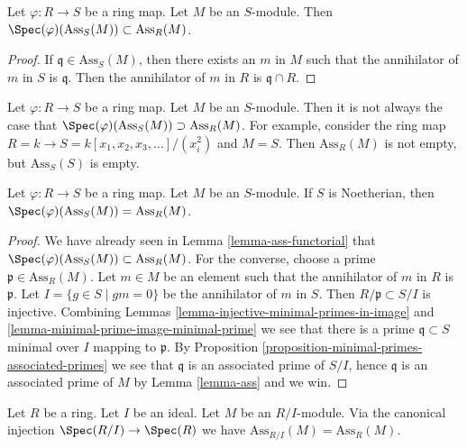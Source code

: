 \begin{lemma}
\label{lemma-ass-functorial}
Let $\varphi : R \to S$ be a ring map.
Let $M$ be an $S$-module.
Then $\Spec(\varphi)(\text{Ass}_S(M)) \subset \text{Ass}_R(M)$.
\end{lemma}

\begin{proof}
If $\mathfrak q \in \text{Ass}_S(M)$, then there exists an $m$ in $M$
such that the annihilator of $m$ in $S$ is $\mathfrak q$. Then the annihilator
of $m$ in $R$ is $\mathfrak q \cap R$.
\end{proof}

\begin{remark}
\label{remark-ass-reverse-functorial}
Let $\varphi : R \to S$ be a ring map.
Let $M$ be an $S$-module.
Then it is not always the case that
$\Spec(\varphi)(\text{Ass}_S(M)) \supset \text{Ass}_R(M)$.
For example, consider the ring map
$R = k \to S = k[x_1, x_2, x_3, \ldots]/(x_i^2)$ and $M = S$.
Then $\text{Ass}_R(M)$ is not empty, but $\text{Ass}_S(S)$ is empty.
\end{remark}

\begin{lemma}
\label{lemma-ass-functorial-Noetherian}
Let $\varphi : R \to S$ be a ring map.
Let $M$ be an $S$-module. If $S$ is Noetherian, then
$\Spec(\varphi)(\text{Ass}_S(M)) = \text{Ass}_R(M)$.
\end{lemma}

\begin{proof}
We have already seen in
Lemma \ref{lemma-ass-functorial}
that
$\Spec(\varphi)(\text{Ass}_S(M)) \subset \text{Ass}_R(M)$.
For the converse, choose a prime $\mathfrak p \in \text{Ass}_R(M)$.
Let $m \in M$ be an element such that the annihilator of $m$ in $R$
is $\mathfrak p$. Let $I = \{g \in S \mid gm = 0\}$ be the annihilator
of $m$ in $S$. Then $R/\mathfrak p \subset S/I$ is injective.
Combining Lemmas \ref{lemma-injective-minimal-primes-in-image} and
\ref{lemma-minimal-prime-image-minimal-prime} we see that
there is a prime $\mathfrak q \subset S$ minimal over $I$
mapping to $\mathfrak p$. By
Proposition \ref{proposition-minimal-primes-associated-primes}
we see that $\mathfrak q$ is an associated prime of $S/I$, hence
$\mathfrak q$ is an associated prime of $M$ by
Lemma \ref{lemma-ass}
and we win.
\end{proof}

\begin{lemma}
\label{lemma-ass-quotient-ring}
Let $R$ be a ring.
Let $I$ be an ideal.
Let $M$ be an $R/I$-module.
Via the canonical injection
$\Spec(R/I) \to \Spec(R)$
we have $\text{Ass}_{R/I}(M) = \text{Ass}_R(M)$.
\end{lemma}

